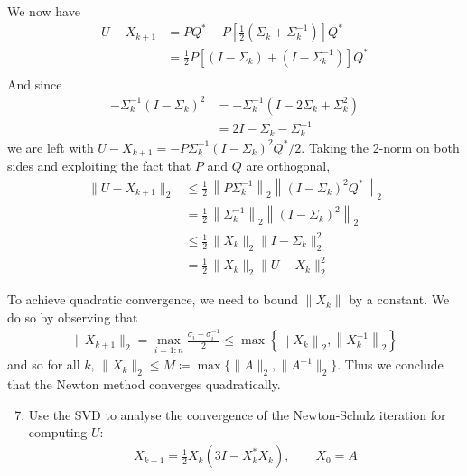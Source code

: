 \documentclass[10pt, A4paper]{article}
\begin{document}
We now have
\begin{align}
	U - X_{k+1} &= PQ^* - P\left[\frac{1}{2}
	\left(\Sigma_k + \Sigma_k^{-1}\right)\right] Q^* \\
	&= \frac{1}{2} P \left[\left(I - \Sigma_k\right) + 
	\left(I - \Sigma_k^{-1}\right) \right] Q^* \\
\end{align}
And since
\begin{align}
	- \Sigma_k^{-1} (I - \Sigma_k)^2 &= -\Sigma_k^{-1}
	\left(I - 2 \Sigma_k + \Sigma_k^2\right) \\
	&= 2I -\Sigma_k - \Sigma_k^{-1}
\end{align}
we are left with $U - X_{k+1} = -P \Sigma_k^{-1} \left( I - \Sigma_k
\right)^2 Q^* /2$.
Taking the 2-norm on both sides and exploiting the fact that $P$ and 
$Q$ are orthogonal,
\begin{align}
	\| U - X_{k+1} \|_2 &\leq \frac{1}{2}\, \left\| P\Sigma_k^{-1} 
	\right\|_2 \left\| (I - \Sigma_k)^2 Q^*\right\|_2 \\
	&= \frac{1}{2}\, \left\|\Sigma_k^{-1}\right\|_2 \left\| \left( I - 
	\Sigma_k \right)^2 \right\|_2 \\
	&\leq \frac{1}{2}\, \|X_k\|_2 \|I - \Sigma_k\|_2^2 \\
	&= \frac{1}{2}\, \|X_k\|_2 \|U - X_k\|_2^2
\end{align}

To achieve quadratic convergence, we need to bound $\|X_k\|$ by a 
constant. We do so by observing that
\begin{align}
	\|X_{k+1}\|_2 = \max_{i = 1:n} \frac{\sigma_i + \sigma_i^{-1}}{2}
	\leq \max \left\{ \left\|X_k \right\|_2
	, \left\|X_k^{-1} \right\|_2 \right\}
\end{align}
and so for all $k$, $\|X_k\|_2 \leq M \coloneqq \max\{\|A\|_2, 
\|A^{-1}\|_2\}$.
Thus we conclude that the Newton method converges quadratically.





\vspace{0.2cm}
\begin{enumerate}
	\setcounter{enumi}{6}
	\item Use the SVD to analyse the convergence of the
	Newton\nobreakdash-Schulz iteration for computing $U$:
	\begin{align*}
		X_{k+1} = \frac{1}{2}X_k(3I - X_k^* X_k), \qquad X_0 = A
	\end{align*}
\end{enumerate}
\end{document}
